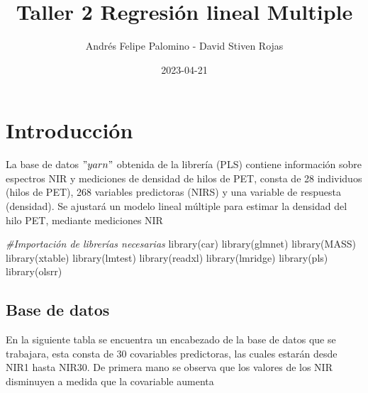 \documentclass[
]{article}
\title{Taller 2 Regresión lineal Multiple}
\author{Andrés Felipe Palomino - David Stiven Rojas}
\date{2023-04-21}
\newenvironment{Shaded}{\begin{snugshade}}{\end{snugshade}}
\newcommand{\AttributeTok}[1]{\textcolor[rgb]{0.77,0.63,0.00}{#1}}
\newcommand{\CommentTok}[1]{\textcolor[rgb]{0.56,0.35,0.01}{\textit{#1}}}
\newcommand{\DecValTok}[1]{\textcolor[rgb]{0.00,0.00,0.81}{#1}}
\newcommand{\FunctionTok}[1]{\textcolor[rgb]{0.00,0.00,0.00}{#1}}
\newcommand{\NormalTok}[1]{#1}
\newcommand{\OtherTok}[1]{\textcolor[rgb]{0.56,0.35,0.01}{#1}}
\newcommand{\SpecialCharTok}[1]{\textcolor[rgb]{0.00,0.00,0.00}{#1}}
\newcommand{\StringTok}[1]{\textcolor[rgb]{0.31,0.60,0.02}{#1}}
\begin{document}
\maketitle

\hypertarget{introducciuxf3n}{%
\section{Introducción}\label{introducciuxf3n}}

La base de datos \("yarn"\) obtenida de la librería (PLS) contiene
información sobre espectros NIR y mediciones de densidad de hilos de
PET, consta de 28 individuos (hilos de PET), 268 variables predictoras
(NIRS) y una variable de respuesta (densidad). Se ajustará un modelo
lineal múltiple para estimar la densidad del hilo PET, mediante
mediciones NIR

\begin{Shaded}
\begin{Highlighting}[]
\CommentTok{\#Importación de librerías necesarias}
\FunctionTok{library}\NormalTok{(car)}
\FunctionTok{library}\NormalTok{(glmnet)}
\FunctionTok{library}\NormalTok{(MASS)}
\FunctionTok{library}\NormalTok{(xtable)}
\FunctionTok{library}\NormalTok{(lmtest)}
\FunctionTok{library}\NormalTok{(readxl)}
\FunctionTok{library}\NormalTok{(lmridge)}
\FunctionTok{library}\NormalTok{(pls)}
\FunctionTok{library}\NormalTok{(olsrr)}
\end{Highlighting}
\end{Shaded}

\hypertarget{base-de-datos}{%
\subsection{Base de datos}\label{base-de-datos}}

En la siguiente tabla se encuentra un encabezado de la base de datos que
se trabajara, esta consta de 30 covariables predictoras, las cuales
estarán desde NIR1 hasta NIR30. De primera mano se observa que los
valores de los NIR disminuyen a medida que la covariable aumenta

\begin{Shaded}
\end{Shaded}
\end{document}
